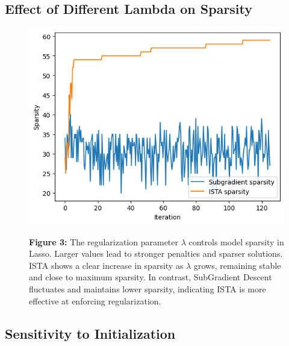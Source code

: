 \documentclass[11pt]{article}
\begin{document}


\subsection{Effect of Different Lambda on Sparsity}

\begin{figure}[H]
    \centering
    \begin{minipage}{0.3\textwidth}
        \includegraphics[width=\linewidth]{figures/fig5.png}
    \end{minipage}
    \hfill
    \begin{minipage}{0.5\textwidth}
        \small
        \textbf{Figure 3:}
        The regularization parameter \( \lambda \) controls model sparsity in Lasso. Larger values lead to stronger penalties and sparser solutions.
        ISTA shows a clear increase in sparsity as \( \lambda \) grows, remaining stable and close to maximum sparsity. In contrast, SubGradient Descent fluctuates and maintains lower sparsity, indicating ISTA is more effective at enforcing regularization.
    \end{minipage}
\end{figure}




\subsection{Sensitivity to Initialization}
\end{document}
